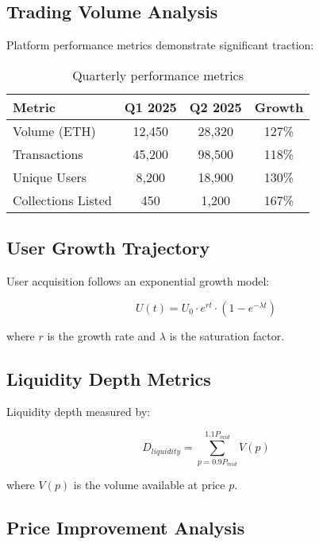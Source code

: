 \documentclass[11pt,a4paper]{article}
\begin{document}
\subsection{Trading Volume Analysis}

Platform performance metrics demonstrate significant traction:

\begin{table}[h]
\centering
\begin{tabular}{|l|c|c|c|}
\hline
\textbf{Metric} & \textbf{Q1 2025} & \textbf{Q2 2025} & \textbf{Growth} \\
\hline
Volume (ETH) & 12,450 & 28,320 & 127\% \\
Transactions & 45,200 & 98,500 & 118\% \\
Unique Users & 8,200 & 18,900 & 130\% \\
Collections Listed & 450 & 1,200 & 167\% \\
\hline
\end{tabular}
\caption{Quarterly performance metrics}
\end{table}

\subsection{User Growth Trajectory}

User acquisition follows an exponential growth model:

\begin{equation}
U(t) = U_0 \cdot e^{rt} \cdot (1 - e^{-\lambda t})
\end{equation}

where $r$ is the growth rate and $\lambda$ is the saturation factor.

\subsection{Liquidity Depth Metrics}

Liquidity depth measured by:

\begin{equation}
D_{liquidity} = \sum_{p=0.9P_{mid}}^{1.1P_{mid}} V(p)
\end{equation}

where $V(p)$ is the volume available at price $p$.

\subsection{Price Improvement Analysis}
\end{document}
